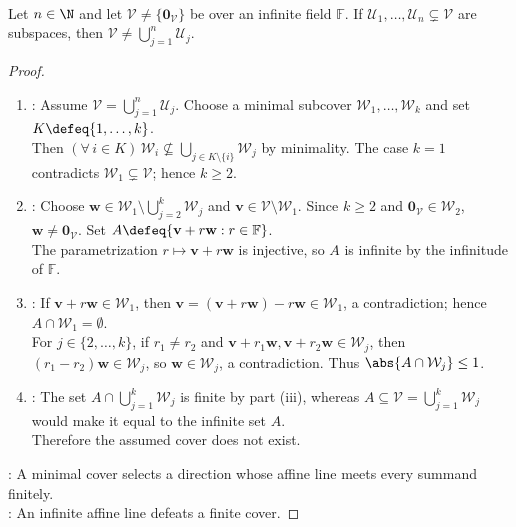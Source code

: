 \begin{theorem} \label{thm:finite-union-proper-subspaces-infinite-field} \\
Let $n\in\N$ and let $\mathcal{V}\neq\{\mathbf{0}_{\mathcal{V}}\}$ be over an infinite field $\mathbb{F}$. If $\mathcal{U}_1,\ldots,\mathcal{U}_n\subsetneq\mathcal{V}$ are subspaces, then $\mathcal{V}\neq\bigcup\limits_{j=1}^{n}\mathcal{U}_j$.
\begin{proof}
\begin{enumerate}[label=(\roman*)]
\setlength{\itemsep}{0pt}
\item {}: Assume $\mathcal{V}=\bigcup\limits_{j=1}^{n}\mathcal{U}_j$. Choose a minimal subcover $\mathcal{W}_1,\ldots,\mathcal{W}_k$ and set $K\defeq\{1,\ldots,k\}$.\\
Then $(\forall\,i\in K)\,\mathcal{W}_i\not\subseteq\bigcup\limits_{j\in K\setminus\{i\}}\mathcal{W}_j$ by minimality. The case $k=1$ contradicts $\mathcal{W}_1\subsetneq\mathcal{V}$; hence $k\geq2$.
\item {}: Choose $\mathbf{w}\in\mathcal{W}_1\setminus\bigcup\limits_{j=2}^{k}\mathcal{W}_j$ and $\mathbf{v}\in\mathcal{V}\setminus\mathcal{W}_1$. Since $k\geq2$ and $\mathbf{0}_{\mathcal{V}}\in\mathcal{W}_2$, $\mathbf{w}\neq\mathbf{0}_{\mathcal{V}}$. Set $A\defeq\{\mathbf{v}+r\mathbf{w}:r\in\mathbb{F}\}$.\\
The parametrization $r\mapsto\mathbf{v}+r\mathbf{w}$ is injective, so $A$ is infinite by the infinitude of $\mathbb{F}$.
\item {}: If $\mathbf{v}+r\mathbf{w}\in\mathcal{W}_1$, then $\mathbf{v}=(\mathbf{v}+r\mathbf{w})-r\mathbf{w}\in\mathcal{W}_1$, a contradiction; hence $A\cap\mathcal{W}_1=\emptyset$.\\
For $j\in\{2,\ldots,k\}$, if $r_1\neq r_2$ and $\mathbf{v}+r_1\mathbf{w},\mathbf{v}+r_2\mathbf{w}\in\mathcal{W}_j$, then $(r_1-r_2)\mathbf{w}\in\mathcal{W}_j$, so $\mathbf{w}\in\mathcal{W}_j$, a contradiction. Thus $\abs{A\cap\mathcal{W}_j}\leq1$.
\item {}: The set $A\cap\bigcup\limits_{j=1}^{k}\mathcal{W}_j$ is finite by part (iii), whereas $A\subseteq\mathcal{V}=\bigcup\limits_{j=1}^{k}\mathcal{W}_j$ would make it equal to the infinite set $A$.\\
Therefore the assumed cover does not exist.
\end{enumerate}
: A minimal cover selects a direction whose affine line meets every summand finitely.\\
: An infinite affine line defeats a finite cover.
\end{proof}
\end{theorem}


